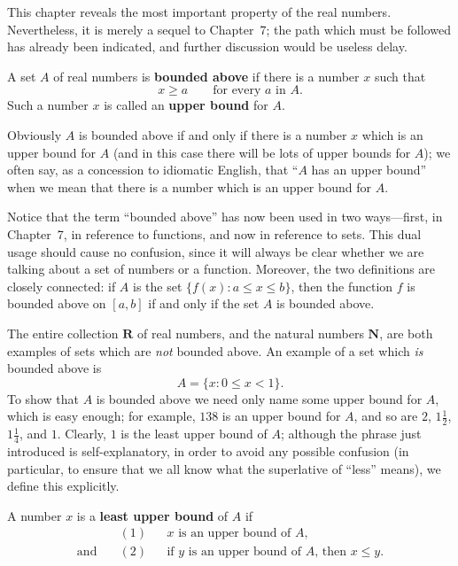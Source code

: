 

This chapter reveals the most important property of the real numbers.
Nevertheless, it is merely a sequel to Chapter~7; the path which must be
followed has already been indicated, and further discussion would be useless
delay.

\begin{spivakdefn}
A set $A$ of real numbers is \textbf{bounded above} if there is a number $x$
such that
\[
x \geq a \qquad\text{for every $a$ in $A$.}
\]
Such a number $x$ is called an \textbf{upper bound} for $A$.
\end{spivakdefn}

Obviously $A$ is bounded above if and only if there is a number $x$ which is
an upper bound for $A$ (and in this case there will be lots of upper bounds
for $A$); we often say, as a concession to idiomatic English, that ``$A$ has
an upper bound'' when we mean that there is a number which is an upper bound
for $A$.

Notice that the term ``bounded above'' has now been used in two ways---first,
in Chapter~7, in reference to functions, and now in reference to sets. This
dual usage should cause no confusion, since it will always be clear whether
we are talking about a set of numbers or a function. Moreover, the two
definitions are closely connected: if $A$ is the set $\{f(x) : a \leq x \leq b\}$,
then the function $f$ is bounded above on $[a,b]$ if and only if the set $A$
is bounded above.

The entire collection $\mathbf{R}$ of real numbers, and the natural numbers
$\mathbf{N}$, are both examples of sets which are \emph{not} bounded above.
An example of a set which \emph{is} bounded above is
\[
A = \{x : 0 \leq x < 1\}.
\]
To show that $A$ is bounded above we need only name some upper bound for $A$,
which is easy enough; for example, $138$ is an upper bound for $A$, and so are
$2$, $1\frac{1}{2}$, $1\frac{1}{4}$, and $1$. Clearly, $1$ is the least upper
bound of $A$; although the phrase just introduced is self-explanatory, in
order to avoid any possible confusion (in particular, to ensure that we all
know what the superlative of ``less'' means), we define this explicitly.

\begin{spivakdefn}
A number $x$ is a \textbf{least upper bound} of $A$ if
\begin{align*}
&(1) && \text{$x$ is an upper bound of $A$,}\\
\text{and}\quad &(2) && \text{if $y$ is an upper bound of $A$, then $x \leq y$.}
\end{align*}
\end{spivakdefn}

